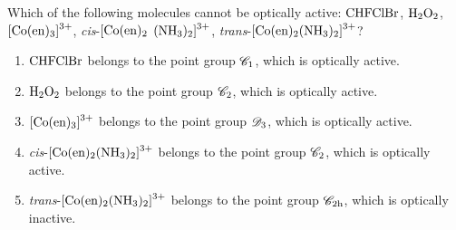 \documentclass[a4paper]{book}
\begin{document}
	\begin{exercise}
	Which of the following molecules cannot be optically active: $\ce{CHFClBr}$, $\ce{H2O2}$, $\ce{[Co(en)3]^{3+}}$, {\it cis}-$\ce{[Co(en)2}$ $\ce{(NH3)2]^{3+}}$, {\it trans}-$\ce{[Co(en)2(NH3)2]^{3+}}$?
	\end{exercise}
	
	\begin{solution}
		
		\begin{enumerate}[label=(\alph*)]
		
		\item $\ce{CHFClBr}$ belongs to the point group $\mathscr{C}_{\rm 1}$, which is optically active.
		
		\item $\ce{H2O2}$ belongs to the point group $\mathscr{C}_{\rm 2}$, which is optically active.
		
		\item $\ce{[Co(en)3]^{3+}}$ belongs to the point group $\mathscr{D}_{\rm 3}$, which is optically active.
		
		\item {\it cis}-$\ce{[Co(en)2(NH3)2]^{3+}}$ belongs to the point group $\mathscr{C}_{\rm 2}$, which is optically active.
		
		\item {\it trans}-$\ce{[Co(en)2(NH3)2]^{3+}}$ belongs to the point group $\mathscr{C}_{\rm 2h}$, which is optically inactive.
		
		\end{enumerate}
		
	\end{solution}
\end{document}
